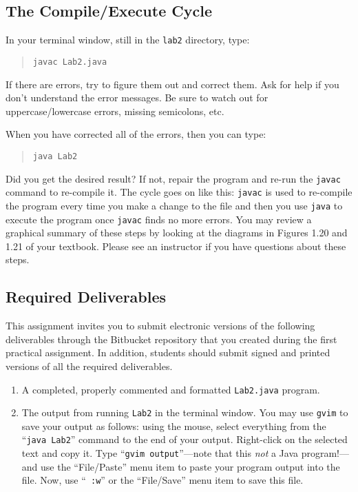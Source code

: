 \subsection*{The Compile/Execute Cycle}
In your terminal window, still in the {\tt lab2} directory, type:

\vspace*{-.1in}
\begin{quote}
{\tt javac Lab2.java} 
\end{quote}
\vspace*{-.1in}

If there are errors, try to figure them out and correct them. Ask for help if
you don't understand the error messages. Be sure to watch out for
uppercase/lowercase errors, missing semicolons, etc.

When you have corrected all of the errors, then you can type:

\vspace*{-.1in}
\begin{quote}
{\tt java Lab2}
\end{quote}
\vspace*{-.1in}

Did you get the desired result? If not, repair the program and re-run the {\tt javac} command to re-compile it.  The
cycle goes on like this: {\tt javac} is used to re-compile the program every time you make a change to the file and then
you use {\tt java} to execute the program once {\tt javac} finds no more errors. You may review a graphical summary of
these steps by looking at the diagrams in Figures 1.20 and 1.21 of your textbook. Please see an instructor if you
have questions about these steps.

\subsection*{Required Deliverables}

This assignment invites you to submit electronic versions of the following deliverables through the Bitbucket repository that
you created during the first practical assignment.  In addition, students should submit signed and printed versions of all
the required deliverables.

\begin{enumerate}

	\item A completed, properly commented and formatted {\tt Lab2.java} program.

        \item The output from running {\tt Lab2} in the terminal window. You may use {\tt gvim} to save your output as
          follows: using the mouse, select everything from the ``{\tt java Lab2}'' command to the end of your output.
          Right-click on the selected text and copy it.  Type ``{\tt gvim output}''---note that this {\em not} a Java
          program!---and use the ``File/Paste'' menu item to paste your program output into the file.  Now, use ``{\tt
          :w}'' or the ``File/Save'' menu item to save this file.

\end{enumerate}

